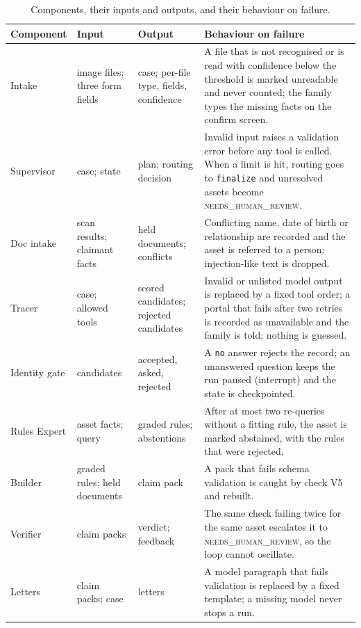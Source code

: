 \begin{table}[H]
\centering\footnotesize{}
\caption[Components and failure behaviour]{Components, their inputs and outputs, and their behaviour on failure.}\label{tab:components}
\renewcommand{\arraystretch}{1.1}
\begin{tabularx}{\linewidth}{@{}p{1.9cm}p{3.2cm}p{2.9cm}X@{}}
\toprule
\textbf{Component} & \textbf{Input} & \textbf{Output} & \textbf{Behaviour on failure} \\ \midrule
Intake & image files; three form fields & case; per-file type, fields, confidence & A file that is not recognised or is read with confidence below the threshold is marked unreadable and never counted; the family types the missing facts on the confirm screen. \\
Supervisor & case; state & plan; routing decision & Invalid input raises a validation error before any tool is called. When a limit is hit, routing goes to \texttt{finalize} and unresolved assets become \textsc{needs\_human\_review}. \\
Doc intake & scan results; claimant facts & held documents; conflicts & Conflicting name, date of birth or relationship are recorded and the asset is referred to a person; injection-like text is dropped. \\
Tracer & case; allowed tools & scored candidates; rejected candidates & Invalid or unlisted model output is replaced by a fixed tool order; a portal that fails after two retries is recorded as unavailable and the family is told; nothing is guessed. \\
Identity gate & candidates & accepted, asked, rejected & A \texttt{no} answer rejects the record; an unanswered question keeps the run paused (interrupt) and the state is checkpointed. \\
Rules Expert & asset facts; query & graded rules; abstentions & After at most two re-queries without a fitting rule, the asset is marked abstained, with the rules that were rejected. \\
Builder & graded rules; held documents & claim pack & A pack that fails schema validation is caught by check V5 and rebuilt. \\
Verifier & claim packs & verdict; feedback & The same check failing twice for the same asset escalates it to \textsc{needs\_human\_review}, so the loop cannot oscillate. \\
Letters & claim packs; case & letters & A model paragraph that fails validation is replaced by a fixed template; a missing model never stops a run. \\ \bottomrule
\end{tabularx}
\end{table}

